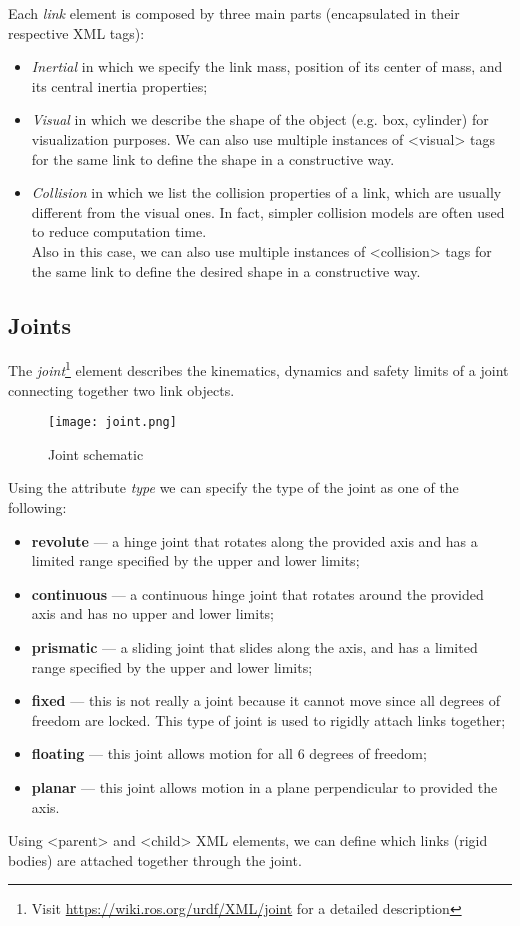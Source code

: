 Each \textit{link} element is composed by three main parts (encapsulated in their respective XML tags): 
\begin{itemize}
    \item \textit{Inertial} in which we specify the link mass, position of its center of mass, and its central inertia properties;
    \item \textit{Visual} in which we describe the shape of the object (e.g. box, cylinder) for visualization purposes. 
            We can also use multiple instances of <visual> tags for the same link to define the shape in a constructive way.
    \item \textit{Collision} in which we list the collision properties of a link, which are usually different from the visual ones. 
            In fact, simpler collision models are often used to reduce computation time. \\
            Also in this case, we can also use multiple instances of <collision> tags for the same link to define
            the desired shape in a constructive way.     
\end{itemize}


\subsection{Joints}
The \textit{joint}\footnote{Visit \url{https://wiki.ros.org/urdf/XML/joint} for a detailed description} 
element describes the kinematics, dynamics and safety limits of a joint connecting together two link objects.\\

\begin{figure}[H]
    \centering
    \texttt{[image: joint.png]}
    \caption{Joint schematic}
\end{figure}

Using the attribute \textit{type} we can specify the type of the joint as one of the following:
\begin{itemize}
    \item \textbf{revolute} — a hinge joint that rotates along the provided axis and has a limited range
                             specified by the upper and lower limits;
    \item \textbf{continuous} — a continuous hinge joint that rotates around the provided axis and has no upper and lower limits;
    \item \textbf{prismatic} — a sliding joint that slides along the axis, and has a limited range 
                                specified by the upper and lower limits;
    \item \textbf{fixed} — this is not really a joint because it cannot move since all degrees of freedom are locked. 
                            This type of joint is used to rigidly attach links together;
    \item \textbf{floating} — this joint allows motion for all 6 degrees of freedom;
    \item \textbf{planar} — this joint allows motion in a plane perpendicular to provided the axis. 
\end{itemize} 
Using <parent> and <child> XML elements, we can define which links (rigid bodies) are attached together through the joint. 


